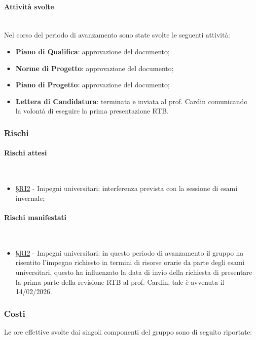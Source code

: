 \documentclass[10pt, letterpaper]{article}
\newcommand{\trisubsection}[1]{\paragraph{#1}\mbox{}\\}
\newcommand{\rif}[1]{\hyperref[#1]{§#1}}
\begin{document}
\trisubsection{Attività svolte}
Nel corso del periodo di avanzamento sono state svolte le seguenti attività:
\begin{itemize}
    \item \textbf{Piano di Qualifica}: approvazione del documento;
    \item \textbf{Norme di Progetto}: approvazione del documento;
    \item \textbf{Piano di Progetto}: approvazione del documento;
    \item \textbf{Lettera di Candidatura}: terminata e inviata al prof. Cardin comunicando la volontà di eseguire la prima presentazione RTB.
\end{itemize}

\subsubsection{Rischi}
\trisubsection{Rischi attesi}
\begin{itemize}
    \item \rif{RI2} - Impegni universitari: interferenza prevista con la sessione di esami invernale;
\end{itemize}
\trisubsection{Rischi manifestati}
\begin{itemize}
    \item \rif{RI2} - Impegni universitari: in questo periodo di avanzamento il gruppo ha risentito l'impegno richiesto in termini
          di risorse orarie da parte degli esami universitari, questo ha influenzato la data di invio della richiesta di presentare la prima
          parte della revisione RTB al prof. Cardin, tale è avvenuta il 14/02/2026.
\end{itemize}

\subsubsection{Costi}
Le ore effettive svolte dai singoli componenti del gruppo sono di seguito riportate:

\setRuoloValeria{\Proge}
\setRuoloLeonardo{\Proge}
\setRuoloFilippo{\Resp}
\setRuoloGiuseppe{\Amm}
\setRuoloFrancesco{\Verif}
\setRuoloChristian{\Proge}
\setRuoloLuca{\Verif}


\end{document}
